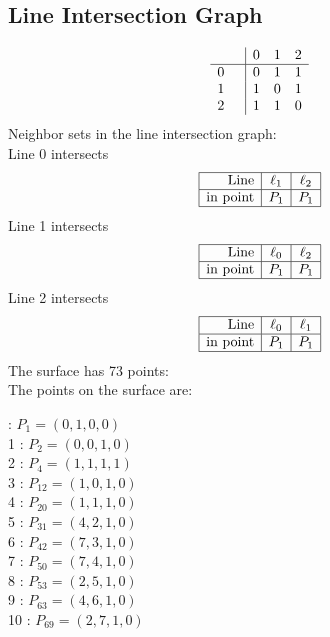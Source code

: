 \documentclass{article}
\begin{document}
{\subsection*{Line Intersection Graph}
{\arraycolsep=1pt
$$
\begin{array}{rr|*{3}r}
 &  & 0 & 1 & 2\\
\hline
0 &  & 0 & 1 & 1\\
1 &  & 1 & 0 & 1\\
2 &  & 1 & 1 & 0\\
\end{array}
$$
}%
Neighbor sets in the line intersection graph:\\
Line 0 intersects 
$$
\begin{array}{|r*{2}{|c}|}
\hline
\mbox{Line}  & \ell_{1} & \ell_{2}\\
\hline
\mbox{in point}  & P_{1} & P_{1}\\
\hline
\end{array}
$$
Line 1 intersects 
$$
\begin{array}{|r*{2}{|c}|}
\hline
\mbox{Line}  & \ell_{0} & \ell_{2}\\
\hline
\mbox{in point}  & P_{1} & P_{1}\\
\hline
\end{array}
$$
Line 2 intersects 
$$
\begin{array}{|r*{2}{|c}|}
\hline
\mbox{Line}  & \ell_{0} & \ell_{1}\\
\hline
\mbox{in point}  & P_{1} & P_{1}\\
\hline
\end{array}
$$
The surface has 73 points:\\
The points on the surface are:\\
\begin{multicols}{3}
 : $P_{1}=( 0, 1, 0, 0 )$\\
1 : $P_{2}=( 0, 0, 1, 0 )$\\
2 : $P_{4}=( 1, 1, 1, 1 )$\\
3 : $P_{12}=( 1, 0, 1, 0 )$\\
4 : $P_{20}=( 1, 1, 1, 0 )$\\
5 : $P_{31}=( 4, 2, 1, 0 )$\\
6 : $P_{42}=( 7, 3, 1, 0 )$\\
7 : $P_{50}=( 7, 4, 1, 0 )$\\
8 : $P_{53}=( 2, 5, 1, 0 )$\\
9 : $P_{63}=( 4, 6, 1, 0 )$\\
10 : $P_{69}=( 2, 7, 1, 0 )$\\

\end{multicols}}
\end{document}
